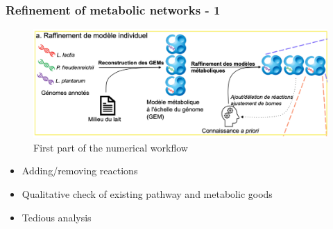 \documentclass[8pt]{beamer}
\begin{document}
%
%
\begin{frame}
\frametitle{Refinement of metabolic networks - 1}

\begin{figure}
\includegraphics[width=\textwidth]{figures/global-a}
\caption{First part of the numerical workflow}
\end{figure}

\begin{block}{}
\begin{itemize}
\item Adding/removing reactions
\item Qualitative check of existing pathway and metabolic goods
\item Tedious analysis
\end{itemize}
\end{block}

\end{frame}
\end{document}
